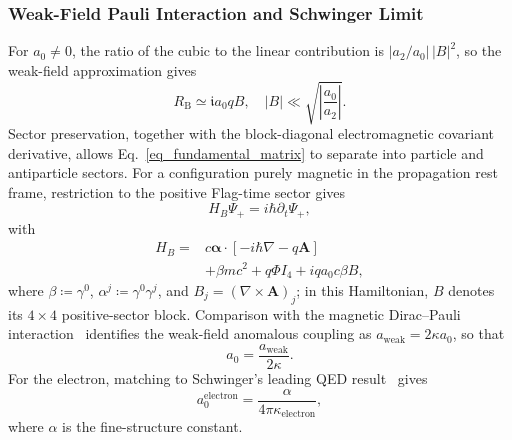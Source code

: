 \subsubsection{Weak-Field Pauli Interaction and Schwinger Limit}
For $a_{0}\neq0$, the ratio of the cubic to the linear contribution is $|a_{2}/a_{0}|\,|B|^2$, so the weak-field approximation gives
\begin{equation}
    R_{\mathrm{B}}\simeq \mathfrak{i}a_{0}qB,\quad |B|\ll\sqrt{\left|\frac{a_{0}}{a_{2}}\right|}.
\end{equation}
Sector preservation, together with the block-diagonal electromagnetic covariant derivative, allows Eq.~\eqref{eq_fundamental_matrix} to separate into particle and antiparticle sectors. For a configuration purely magnetic in the propagation rest frame, restriction to the positive Flag-time sector gives
\begin{equation}
    H_{B}\Psi_+=i\hbar\partial_t\Psi_+,
\end{equation}
with
\begin{equation}\label{eq_magnetic_test_hamiltonian}
    \begin{split}
        H_{B}={}&c\boldsymbol{\alpha}\cdot\left[-i\hbar\nabla-q\boldsymbol{A}\right]\\
        &+\beta mc^2+q\Phi I_4+iqa_{0}c\beta B,
    \end{split}
\end{equation}
where $\beta\coloneqq\gamma^0$, $\alpha^j\coloneqq\gamma^0\gamma^j$, and $B_j=(\nabla\times\boldsymbol{A})_j$; in this Hamiltonian, $B$ denotes its $4\times4$ positive-sector block. Comparison with the magnetic Dirac--Pauli interaction~\cite{pauli1941_relativistic} identifies the weak-field anomalous coupling as $a_{\mathrm{weak}}=2\kappa a_{0}$, so that
\begin{equation}
    a_{0}=\frac{a_{\mathrm{weak}}}{2\kappa}.
\end{equation}
For the electron, matching to Schwinger's leading QED result~\cite{schwinger1948_magnetic_moment} gives
\begin{equation}
    a_{\mathrm{0}}^{\mathrm{electron}}=\frac{\alpha}{4\pi\kappa_{\mathrm{electron}}},
\end{equation}
where $\alpha$ is the fine-structure constant.


